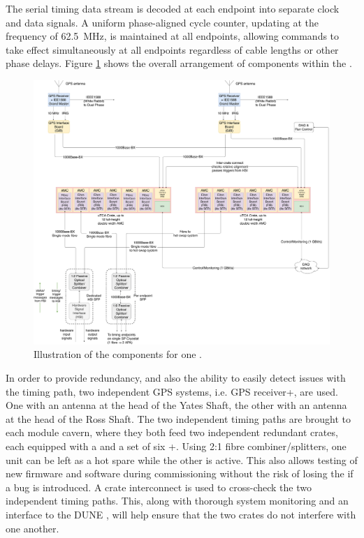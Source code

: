 \documentclass{dune}
\begin{document}
The serial timing data stream is decoded at each endpoint into separate clock and data signals. A uniform phase-aligned cycle counter, updating at the  frequency of \SI{62.5}{\MHz}, is maintained at all endpoints, allowing commands to take effect simultaneously at all endpoints regardless of cable lengths or other phase delays. Figure \ref{fig:daq-readout-timing} shows the overall arrangement of components within the .

\begin{figure}[h]
\includegraphics[width=\textwidth]{DUNE_SP_Timing_DAQ_on_CryoM_GPS_In_CUC_01april20.pdf}
\caption{Illustration of the  components for one  .}
\label{fig:daq-readout-timing}
\end{figure}

In order to provide redundancy, and also the ability to easily detect issues with the timing path, two independent GPS systems, i.e. GPS receiver+, are used. One with an antenna at the head of the Yates Shaft, the other with an antenna at the head of the Ross Shaft. The two independent timing paths are brought to each module cavern, where they both feed two independent redundant  crates, each equipped with a  and a set of six +. Using 2:1 fibre combiner/splitters, one  unit can be left as a hot spare while the other is active. This also allows testing of new firmware and software during commissioning without the risk of losing the  if a bug is introduced. A  crate interconnect is used to cross-check the two independent timing paths. This, along with thorough system monitoring and an interface to the DUNE , will help ensure that the two  crates do not interfere with one another.
\end{document}
